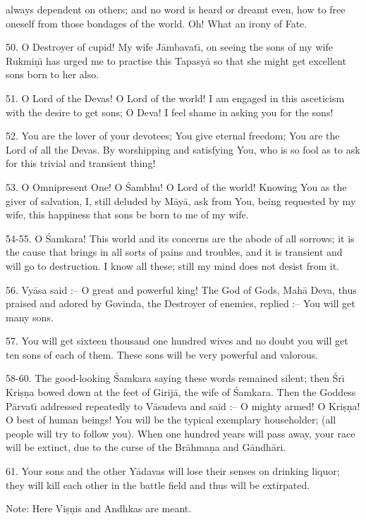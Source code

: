 always dependent on others; and no word is heard or dreamt even, how to free oneself from those bondages of the world. Oh! What an irony of Fate.

50. O Destroyer of cupid! My wife J\=ambavat\={\i}, on seeing the sons of my wife Rukmi\d{n}\={\i} has urged me to practise this Tapasy\=a so that she might get excellent sons born to her also.

51. O Lord of the Devas! O Lord of the world! I am engaged in this asceticism with the desire to get sons; O Deva! I feel shame in asking you for the sons!

52. You are the lover of your devotees; You give eternal freedom; You are the Lord of all the Devas. By worshipping and satisfying You, who is so fool as to ask for this trivial and transient thing!

53. O Omnipresent One! O \'Sambhu! O Lord of the world! Knowing You as the giver of salvation, I, still deluded by M\=ay\=a, ask from You, being requested by my wife, this happiness that sons be born to me of my wife.

54-55. O \'Samkara! This world and its concerns are the abode of all sorrows; it is the cause that brings in all sorts of pains and troubles, and it is transient and will go to destruction. I know all these; still my mind does not desist from it.

56. Vy\=asa said :-- O great and powerful king! The God of Gods, Mah\=a Deva, thus praised and adored by Govinda, the Destroyer of enemies, replied :-- You will get many sons.

57. You will get sixteen thousand one hundred wives and no doubt you will get ten sons of each of them. These sons will be very powerful and valorous.

58-60. The good-looking \'Samkara saying these words remained silent; then \'Sr\={\i} Kri\d{s}\d{n}a bowed down at the feet of Girij\=a, the wife of \'Samkara. Then the Goddess P\=arvat\={\i} addressed repeatedly to V\=asudeva and said :-- O mighty armed! O Kri\d{s}\d{n}a! O best of human beings! You will be the typical exemplary householder; (all people will try to follow you). When one hundred years will pass away, your race will be extinct, due to the curse of the Br\=ahma\d{n}a and G\=andh\=ari.

61. Your sons and the other Y\=adavas will lose their senses on drinking liquor; they will kill each other in the battle field and thus will be extirpated.

Note: Here Vi\d{s}\d{n}is and Andhkas are meant.

